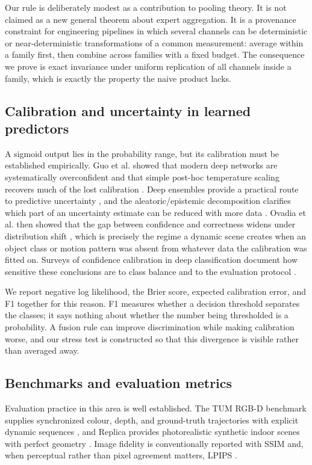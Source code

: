\documentclass[10pt,conference]{IEEEtran}
\begin{document}
Our rule is deliberately modest as a contribution to pooling theory. It is not claimed as a new general theorem about expert aggregation. It is a provenance constraint for engineering pipelines in which several channels can be deterministic or near-deterministic transformations of a common measurement: average within a family first, then combine across families with a fixed budget. The consequence we prove is exact invariance under uniform replication of all channels inside a family, which is exactly the property the naive product lacks.

\subsection{Calibration and uncertainty in learned predictors}
A sigmoid output lies in the probability range, but its calibration must be established empirically. Guo et al. showed that modern deep networks are systematically overconfident and that simple post-hoc temperature scaling recovers much of the lost calibration \cite{guo2017calibration}. Deep ensembles provide a practical route to predictive uncertainty \cite{lakshminarayanan2017ensembles}, and the aleatoric/epistemic decomposition clarifies which part of an uncertainty estimate can be reduced with more data \cite{kendall2017uncertainties}. Ovadia et al. then showed that the gap between confidence and correctness widens under distribution shift \cite{ovadia2019trust}, which is precisely the regime a dynamic scene creates when an object class or motion pattern was absent from whatever data the calibration was fitted on. Surveys of confidence calibration in deep classification document how sensitive these conclusions are to class balance and to the evaluation protocol \cite{dong2025calsurvey}.

We report negative log likelihood, the Brier score, expected calibration error, and F1 together for this reason. F1 measures whether a decision threshold separates the classes; it says nothing about whether the number being thresholded is a probability. A fusion rule can improve discrimination while making calibration worse, and our stress test is constructed so that this divergence is visible rather than averaged away.

\subsection{Benchmarks and evaluation metrics}
Evaluation practice in this area is well established. The TUM RGB-D benchmark supplies synchronized colour, depth, and ground-truth trajectories with explicit dynamic sequences \cite{sturm2012tum}, and Replica provides photorealistic synthetic indoor scenes with perfect geometry \cite{straub2019replica}. Image fidelity is conventionally reported with SSIM \cite{wang2004ssim} and, when perceptual rather than pixel agreement matters, LPIPS \cite{zhang2018lpips}.
\end{document}
